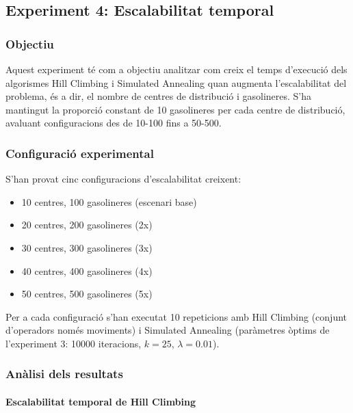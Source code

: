 \subsection{Experiment 4: Escalabilitat temporal}

\vspace{0.75cm}

\subsubsection{Objectiu}

Aquest experiment té com a objectiu analitzar com creix el temps d'execució dels algorismes Hill Climbing i Simulated Annealing quan augmenta l'escalabilitat del problema, és a dir, el nombre de centres de distribució i gasolineres. S'ha mantingut la proporció constant de 10 gasolineres per cada centre de distribució, avaluant configuracions des de 10-100 fins a 50-500.

\subsubsection{Configuració experimental}

S'han provat cinc configuracions d'escalabilitat creixent:
\begin{itemize}
    \item 10 centres, 100 gasolineres (escenari base)
    \item 20 centres, 200 gasolineres (2x)
    \item 30 centres, 300 gasolineres (3x)
    \item 40 centres, 400 gasolineres (4x)
    \item 50 centres, 500 gasolineres (5x)
\end{itemize}

Per a cada configuració s'han executat 10 repeticions amb Hill Climbing (conjunt d'operadors només moviments) i Simulated Annealing (paràmetres òptims de l'experiment 3: 10000 iteracions, $k=25$, $\lambda=0.01$).

\subsubsection{Anàlisi dels resultats}

\paragraph{Escalabilitat temporal de Hill Climbing}

